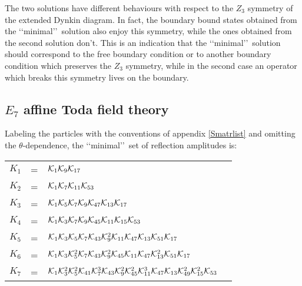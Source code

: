 \documentclass[a4paper,12pt]{report}
\begin{document}
\vspace{0.5cm}

The two solutions have different behaviours with respect to the $Z_{3}$ symmetry of the extended Dynkin diagram.
In fact, the boundary bound states obtained from the \lq\lq minimal\rq\rq \, solution also enjoy this symmetry,
while the ones obtained from the second solution don't. This is an indication that the \lq\lq minimal\rq\rq \,
solution should correspond to the free boundary condition or to another boundary condition which preserves the
$Z_{3}$ symmetry, while in the second case an operator which breaks this symmetry lives on the boundary.


\subsection{$E_{7}$ affine Toda field theory}

Labeling the particles with the conventions of appendix \ref{Smatrlist} and omitting the $\theta$-dependence, the
\lq\lq minimal\rq\rq \, set of reflection amplitudes is:

\begin{center}
\begin{tabular}{cclc|}
$K_{1}$&=& ${\cal K}_{1}{\cal K}_{9}{\cal K}_{17}$  \\
$K_{2}$&=& ${\cal K}_{1}{\cal K}_{7}{\cal K}_{11} {\cal K}_{53} $\\
$K_{3}$&=& ${\cal K}_{1}{\cal K}_{5}{\cal K}_{7}{\cal K}_{9}{\cal K}_{47}{\cal K}_{13} {\cal K}_{17}$ \\
$K_{4}$&=& ${\cal K}_{1}{\cal K}_{3}{\cal K}_{7}{\cal K}_{9}{\cal K}_{45}{\cal K}_{11} {\cal K}_{15}{\cal K}_{53}$ \\
$K_{5}$&=& ${\cal K}_{1}{\cal K}_{3}{\cal K}_{5}{\cal K}_{7}{\cal K}_{43}{\cal K}_{9}^{2}{\cal K}_{11}{\cal K}_{47} {\cal K}_{13}{\cal K}_{51}{\cal K}_{17}$ \\
$K_{6}$&=& ${\cal K}_{1}{\cal K}_{3}{\cal K}_{5}^{2}{\cal K}_{7}{\cal K}_{43}{\cal K}_{9}^{2}{\cal K}_{45}{\cal K}_{11}{\cal K}_{47} {\cal K}_{13}^{2}{\cal K}_{51}{\cal K}_{17}$ \\
$K_{7}$&=& ${\cal K}_{1}{\cal K}_{3}^{2}{\cal K}_{5}^{2}{\cal K}_{41}{\cal K}_{7}^{3}{\cal K}_{43}{\cal
K}_{9}^{2}{\cal K}_{45}^{2}{\cal K}_{11}^{3}{\cal K}_{47} {\cal K}_{13}{\cal K}_{49}^{2}{\cal K}_{15}^{2}{\cal
K}_{53}$ \\
\end{tabular}
\end{center}
\end{document}

